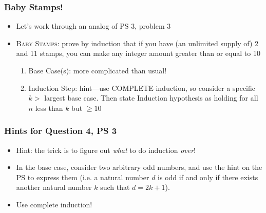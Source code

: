 \begin{frame}
\frametitle{Baby Stamps!}

\begin{itemize}[<+->]
\item Let's work through an analog of PS 3, problem 3

\item \textsc{Baby Stamps}: prove by induction that if you have (an unlimited supply of) {2\textcent}  and {11\textcent}  stamps, you can make any integer amount greater than or equal to {10\textcent} 

\bigskip 

\begin{enumerate}

\item Base Case(s): more complicated than usual!

\item Induction Step: hint---use COMPLETE induction, so consider a specific $k > $ largest base case. Then state Induction hypothesis as holding for all $n$ less than $k$ but $\geq 10$ 
\end{enumerate}


\end{itemize} 
\end{frame}

\begin{frame}
\frametitle{Hints for Question 4, PS 3}

\begin{itemize}[<+->]
\item Hint: the trick is to figure out \textit{what} to do induction \textit{over}!


\item In the base case, consider two arbitrary odd numbers, and use the hint on the PS to express them (i.e. a natural number $d$ is odd if and only if there exists another natural number $k$ such that $d = 2k +1$). 

\item Use complete induction! 




\end{itemize} 
\end{frame}


